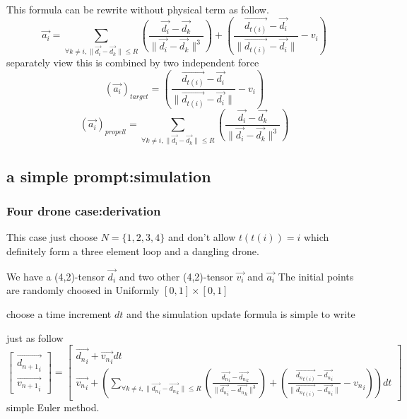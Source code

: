 \documentclass{article}
\theoremstyle{definition} %
\begin{document}
This formula can be rewrite without physical term as
follow.
\[
    \vec{a_i}=\sum_{\forall k\neq i,\|\vec{d_i}-\vec{d_k}\|\leq R}(\frac{\vec{d_i}-\vec{d_k}}{\|\vec{d_i}-\vec{d_k}\|^3})+(\frac{\vec{d_{t(i)}}-\vec{d_i}}{\|\vec{d_{t(i)}}-\vec{d_i}\|}-v_i)
\]
separately view this is combined by two independent force
\[
    (\vec{a_i})_{target}=(\frac{\vec{d_{t(i)}}-\vec{d_i}}{\|\vec{d_{t(i)}}-\vec{d_i}\|}-v_i)
\]
\[
    (\vec{a_i})_{propell}=\sum_{\forall k\neq i,\|\vec{d_i}-\vec{d_k}\|\leq R}(\frac{\vec{d_i}-\vec{d_k}}{\|\vec{d_i}-\vec{d_k}\|^3})
\]

\subsection{a simple prompt:simulation}
\subsubsection{Four drone case:derivation}
This case just choose \(N=\{1,2,3,4\}\)
and don't allow \(t(t(i))=i\)
which definitely form a three element loop and
a dangling drone.

We have a (4,2)-tensor \(\vec{d_i}\)
and two other (4,2)-tensor \(\vec{v_i}\)
and \(\vec{a_i}\)
The initial points are randomly choosed
in Uniformly \([0,1]\times[0,1]\)

choose a time increment \(dt\)
and the simulation update formula is simple to write

just as follow
\[\begin{bmatrix}
        \vec{{d_{n+1}}_i} \\
        \vec{{v_{n+1}}_i}
    \end{bmatrix}=
    \begin{bmatrix}
        \vec{{d_{n}}_i}+\vec{{v_n}_i}dt \\
        \vec{{v_{n}}_i}+(\sum_{\forall k\neq i,\|\vec{{d_n}_i}-\vec{{d_n}_k}\|\leq R}(\frac{\vec{{d_n}_i}-\vec{{d_n}_k}}{\|\vec{{d_n}_i}-\vec{{d_n}_k}\|^3})+(\frac{\vec{{d_n}_{t(i)}}-\vec{{d_n}_i}}{\|\vec{{d_n}_{t(i)}}-\vec{{d_n}_i}\|}-{v_n}_i))dt
    \end{bmatrix}
\]
simple Euler method.
\end{document}
